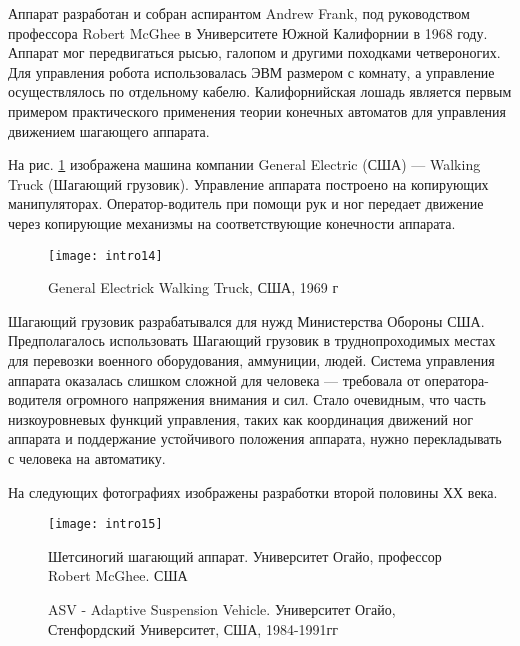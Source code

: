 Аппарат разработан и собран аспирантом Andrew Frank, под руководством профессора Robert McGhee в Университете Южной Калифорнии в 1968 году. Аппарат мог передвигаться рысью, галопом и другими походками четвероногих. Для управления робота использовалась ЭВМ размером с комнату, а управление осуществлялось по отдельному кабелю. Калифорнийская лошадь является первым примером практического применения теории конечных автоматов для управления движением шагающего аппарата.

На рис. \ref{img:walking_truck} изображена машина компании General Electric (США) ---  Walking Truck (Шагающий грузовик). Управление аппарата построено на копирующих манипуляторах. Оператор-водитель при помощи рук и ног передает движение через копирующие механизмы на соответствующие конечности аппарата.

\begin{figure}[h]
\centering
\texttt{[image: intro14]}
\caption{General Electrick Walking Truck, США, 1969 г}
\label{img:walking_truck}
\end{figure}

Шагающий грузовик разрабатывался для нужд Министерства Обороны США. Предполагалось использовать Шагающий грузовик в труднопроходимых местах для перевозки военного оборудования, аммуниции, людей. Система управления аппарата оказалась слишком сложной для человека --- требовала от оператора-водителя огромного напряжения внимания и сил. Стало очевидным, что часть низкоуровневых функций управления, таких как координация движений ног аппарата и поддержание устойчивого положения аппарата, нужно перекладывать с человека на автоматику.

На следующих фотографиях изображены разработки второй половины ХХ века.

\begin{figure}[h]
\centering
\texttt{[image: intro15]}
\caption{Шетсиногий шагающий аппарат. Университет Огайо, профессор Robert McGhee. США}
\label{img:intro15}
\end{figure}

\begin{figure}[h]
  \begin{minipage}[h]{0.49\linewidth}
  \end{minipage}
  \hfill
  \begin{minipage}[h]{0.49\linewidth}
  \end{minipage}
  \caption{ASV - Adaptive Suspension Vehicle. Университет Огайо, Стенфордский Университет, США, 1984-1991гг}
  \label{img:ASV}  
\end{figure}

